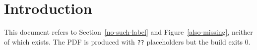 \documentclass{article}
\begin{document}
\section{Introduction}

This document refers to Section~\ref{no-such-label} and
Figure~\ref{also-missing}, neither of which exists.
The PDF is produced with \texttt{??} placeholders but the build exits 0.
\end{document}
